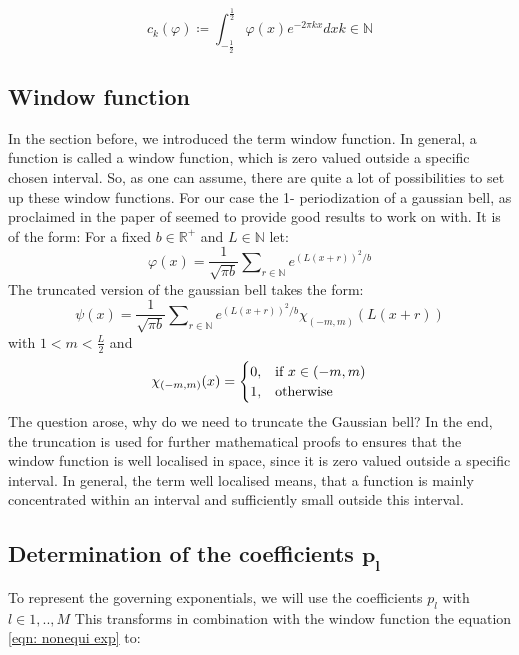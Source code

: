 \documentclass[11pt]{report} %
\begin{document}
\begin{equation}
c_{k} (\varphi) \coloneqq \int_{-\frac{1}{2}}^{\frac{1}{2}} \varphi (x) e^{-2 \pi kx} dx         
k \in \mathbb{N}
\end{equation}

\subsection{Window function}
In the section before, we introduced the term window function.
In general, a function is called a window function, which is zero valued outside a specific chosen interval.
So, as one can assume, there are quite a lot of possibilities to set up these window functions.
For our case the 1- periodization of a gaussian bell, as proclaimed in the paper of \cite{Peter2011} seemed to provide good results to work on with.
It is of the form: 
For a fixed $b \in \mathbb{R}^+$ and $L \in{\mathbb{N}}$ let:
\begin{equation}
\varphi(x)= \frac{1}{\sqrt{\pi b}} \sum\nolimits_{r \in \mathbb{N}}  e^{(L(x+r))^2/b}
\end{equation}
The truncated version of the gaussian bell takes the form: 
\begin{equation}
\psi(x)= \frac{1}{\sqrt{\pi b}} \sum\nolimits_{r \in \mathbb{N}}  e^{(L(x+r))^2/b}\chi_{(-m,m)}(L(x+r))
\end{equation}
with $1<m < \frac{L}{2}$ and
\begin{equation}
    \chi_{(-m,m)}(x)=
    \begin{cases}
      0, & \text{if}\ x\in (-m,m) \\
      1, & \text{otherwise}
    \end{cases}\notag
\end{equation} 
The question arose, why do we need to truncate the Gaussian bell? 
In the end, the truncation is used for further mathematical proofs to ensures that the window function is well localised in space, since it is zero valued outside a specific interval.
In general, the term well localised means, that a function is mainly concentrated within an interval and sufficiently small outside this interval.

\subsection{Determination of the coefficients $\bm{p_l}$}
To represent the governing exponentials, we will use the coefficients $p_l$ with $l \in{1,..,M}$    
This transforms in combination with the window function the equation \eqref{eqn: nonequi exp} to: 
\end{document}
